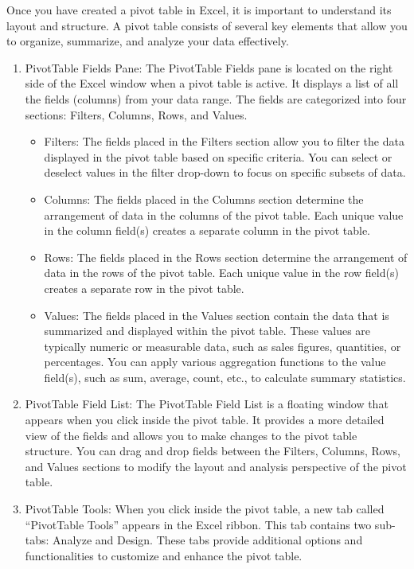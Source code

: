 \documentclass[
]{book}
\providecommand{\tightlist}{%
  \setlength{\itemsep}{0pt}\setlength{\parskip}{0pt}}
\begin{document}
Once you have created a pivot table in Excel, it is important to understand its layout and structure. A pivot table consists of several key elements that allow you to organize, summarize, and analyze your data effectively.

\begin{enumerate}
\def\labelenumi{\arabic{enumi}.}
\item
  PivotTable Fields Pane:
  The PivotTable Fields pane is located on the right side of the Excel window when a pivot table is active. It displays a list of all the fields (columns) from your data range. The fields are categorized into four sections: Filters, Columns, Rows, and Values.

  \begin{itemize}
  \tightlist
  \item
    Filters: The fields placed in the Filters section allow you to filter the data displayed in the pivot table based on specific criteria. You can select or deselect values in the filter drop-down to focus on specific subsets of data.
  \item
    Columns: The fields placed in the Columns section determine the arrangement of data in the columns of the pivot table. Each unique value in the column field(s) creates a separate column in the pivot table.
  \item
    Rows: The fields placed in the Rows section determine the arrangement of data in the rows of the pivot table. Each unique value in the row field(s) creates a separate row in the pivot table.
  \item
    Values: The fields placed in the Values section contain the data that is summarized and displayed within the pivot table. These values are typically numeric or measurable data, such as sales figures, quantities, or percentages. You can apply various aggregation functions to the value field(s), such as sum, average, count, etc., to calculate summary statistics.
  \end{itemize}
\item
  PivotTable Field List:
  The PivotTable Field List is a floating window that appears when you click inside the pivot table. It provides a more detailed view of the fields and allows you to make changes to the pivot table structure. You can drag and drop fields between the Filters, Columns, Rows, and Values sections to modify the layout and analysis perspective of the pivot table.
\item
  PivotTable Tools:
  When you click inside the pivot table, a new tab called ``PivotTable Tools'' appears in the Excel ribbon. This tab contains two sub-tabs: Analyze and Design. These tabs provide additional options and functionalities to customize and enhance the pivot table.


\end{enumerate}
\end{document}
